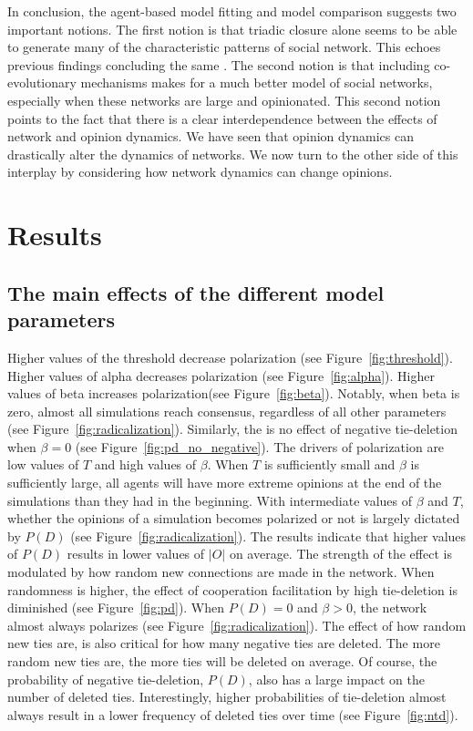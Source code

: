 \documentclass{article}
\begin{document}
In conclusion, the agent-based model fitting and model comparison suggests two important notions. The first notion is that triadic closure alone seems to be able to generate many of the characteristic patterns of social network. This echoes previous findings concluding the same \cite{ilany_social_2016,jackson_meeting_2007, jackson_search_2004}. The second notion is that including co-evolutionary mechanisms makes for a much better model of social networks, especially when these networks are large and opinionated. 
This second notion points to the fact that there is a clear interdependence between the effects of network and opinion dynamics. We have seen that opinion dynamics can drastically alter the dynamics of networks. We now turn to the other side of this interplay by considering how network dynamics can change opinions.

\section{Results}

\subsection{The main effects of the different model parameters}

Higher values of the threshold decrease polarization (see Figure~\ref{fig:threshold}). Higher values of alpha decreases polarization (see Figure~\ref{fig:alpha}). Higher values of beta increases polarization(see Figure~\ref{fig:beta}). Notably, when beta is zero, almost all simulations reach consensus, regardless of all other parameters (see Figure~\ref{fig:radicalization}). Similarly, the is no effect of negative tie-deletion when $\beta = 0$ (see Figure~\ref{fig:pd_no_negative}). 
The drivers of polarization are low values of $T$ and high values of $\beta$. When $T$ is sufficiently small and $\beta$ is sufficiently large, all agents will have more extreme opinions at the end of the simulations than they had in the beginning. With intermediate values of $\beta$ and $T$, whether the opinions of a simulation becomes polarized or not is largely dictated by $P(D)$ (see Figure~\ref{fig:radicalization}). 
The results indicate that higher values of $P(D)$ results in lower values of $|O|$ on average. 
The strength of the effect is modulated by how random new connections are made in the network. 
When randomness is higher, the effect of cooperation facilitation by high tie-deletion is diminished (see Figure~\ref{fig:pd}). 
When $P(D) = 0$ and $\beta > 0$, the network almost always polarizes (see Figure~\ref{fig:radicalization}).
The effect of how random new ties are, is also critical for how many negative ties are deleted. 
The more random new ties are, the more ties will be deleted on average. Of course, the probability of negative tie-deletion, $P(D)$, also has a large impact on the number of deleted ties. 
Interestingly, higher probabilities of tie-deletion almost always result in a lower frequency of deleted ties over time (see Figure~\ref{fig:ntd}).
\end{document}
